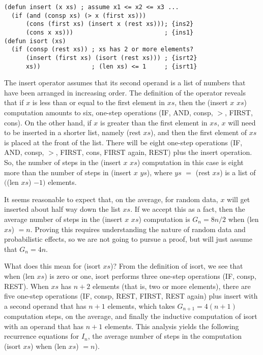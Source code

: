 \label{defun:insert-isort}
\label{defun:isort}
\begin{Verbatim}
(defun insert (x xs) ; assume x1 <= x2 <= x3 ...
  (if (and (consp xs) (> x (first xs)))
      (cons (first xs) (insert x (rest xs))); {ins2}
      (cons x xs)))                         ; {ins1}
(defun isort (xs)
  (if (consp (rest xs)) ; xs has 2 or more elements?
      (insert (first xs) (isort (rest xs))) ; {isrt2}
      xs))              ; (len xs) <= 1     ; {isrt1}
\end{Verbatim}

The insert operator assumes that its second operand
is a list of numbers that have been arranged in increasing order.
The definition of the operator reveals that
if $x$ is less than or equal to the first element in $xs$,
then the  (insert $x$ $xs$)
computation amounts to six, one-step operations
(IF, AND, consp, $>$, FIRST, cons).
On the other hand, if $x$ is greater than the first
element in $xs$,
$x$ will need to be inserted in a shorter list,
namely (rest $xs$), and then the first element of $xs$
is placed at the front of the list.
There will be eight one-step operations
(IF, AND, consp, $>$, FIRST, cons, FIRST again, REST)
plus the insert operation.
So, the number of steps in the (insert $x$ $xs$)
computation in this case is eight more than the number of
steps in (insert $x$ $ys$), where $ys$ $=$ (rest $xs$)
is a list of $($(len $xs$) $- 1)$ elements.

It seems reasonable to expect that, on the average,
for random data, $x$ will get inserted about
half way down the list $xs$.
If we accept this as a fact, then the average
number of steps in the (insert $x$ $xs$) computation is
$G_n = 8n/2$ when (len $xs$) $= n$.
Proving this requires understanding the nature of random
data and probabilistic effects, so we are not going
to pursue a proof, but will just assume that
$G_n = 4n$.

What does this mean for (isort $xs$)?
From the definition of isort, we see that when (len $xs$) is zero or one,
isort performs three one-step operations (IF, consp, REST).
When $xs$ has $n+2$ elements (that is, two or more elements),
there are five one-step operations
(IF, consp, REST, FIRST, REST again)
plus insert with a second operand that has $n+1$ elements,
which takes $G_{n+1} = 4(n+1)$ computation steps,
on the average, and finally the inductive computation of isort
with an operand that has $n+1$ elements.
This analysis yields the following recurrence equations for $I_n$,
the average number of steps in the computation (isort $xs$) when (len $xs$) $= n$).

